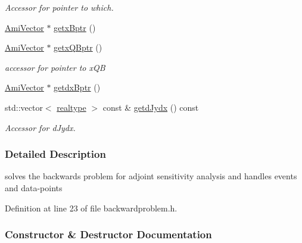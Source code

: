 \begin{DoxyCompactItemize}
\begin{DoxyCompactList}\small\item\em Accessor for pointer to which. \end{DoxyCompactList}\item 
\mbox{\hyperlink{classamici_1_1_ami_vector}{Ami\+Vector}} $\ast$ \mbox{\hyperlink{classamici_1_1_backward_problem_afd910c853cb52a19b17ff8b65832fe2e}{getx\+Bptr}} ()
\item 
\mbox{\hyperlink{classamici_1_1_ami_vector}{Ami\+Vector}} $\ast$ \mbox{\hyperlink{classamici_1_1_backward_problem_a6b43b17396089785a111a5bc1fd27112}{getx\+Q\+Bptr}} ()
\begin{DoxyCompactList}\small\item\em accessor for pointer to x\+QB \end{DoxyCompactList}\item 
\mbox{\hyperlink{classamici_1_1_ami_vector}{Ami\+Vector}} $\ast$ \mbox{\hyperlink{classamici_1_1_backward_problem_ab1f652d5ffaf80adab677b0a8393b48a}{getdx\+Bptr}} ()
\item 
std\+::vector$<$ \mbox{\hyperlink{namespaceamici_a1bdce28051d6a53868f7ccbf5f2c14a3}{realtype}} $>$ const  \& \mbox{\hyperlink{classamici_1_1_backward_problem_aaa2f33176422b55808979bfc7ceb2573}{getd\+Jydx}} () const
\begin{DoxyCompactList}\small\item\em Accessor for d\+Jydx. \end{DoxyCompactList}\end{DoxyCompactItemize}


\subsubsection{Detailed Description}
solves the backwards problem for adjoint sensitivity analysis and handles events and data-\/points 

Definition at line 23 of file backwardproblem.\+h.



\subsubsection{Constructor \& Destructor Documentation}
\mbox{\label{classamici_1_1_backward_problem_a173995c3ce3a4c59d815dfbeebb8dc6e}} 
